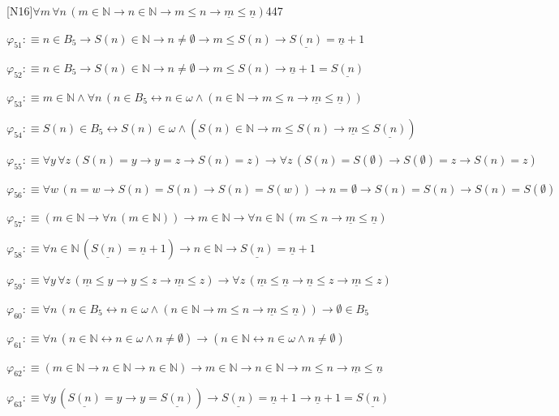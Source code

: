\begin{fullproof}{[N16]}{$\forall m\,\forall n\,(m \in \mathbb{N} \to n \in \mathbb{N} \to m \leq n \to \underline{m} \leq \underline{n})$}{447}
\begin{abbrevlist}
\item $\varphi_{51} :\equiv n \in B_{5} \to S(n) \in \mathbb{N} \to n \neq \emptyset \to m \leq S(n) \to \underline{S(n)} = \underline{n} + 1$
\item $\varphi_{52} :\equiv n \in B_{5} \to S(n) \in \mathbb{N} \to n \neq \emptyset \to m \leq S(n) \to \underline{n} + 1 = \underline{S(n)}$
\item $\varphi_{53} :\equiv m \in \mathbb{N} \land \forall n\,(n \in B_{5} \leftrightarrow n \in \omega \land (n \in \mathbb{N} \to m \leq n \to \underline{m} \leq \underline{n}))$
\item $\varphi_{54} :\equiv S(n) \in B_{5} \leftrightarrow S(n) \in \omega \land (S(n) \in \mathbb{N} \to m \leq S(n) \to \underline{m} \leq \underline{S(n)})$
\item $\varphi_{55} :\equiv \forall y\,\forall z\,(S(n) = y \to y = z \to S(n) = z) \to \forall z\,(S(n) = S(\emptyset) \to S(\emptyset) = z \to S(n) = z)$
\item $\varphi_{56} :\equiv \forall w\,(n = w \to S(n) = S(n) \to S(n) = S(w)) \to n = \emptyset \to S(n) = S(n) \to S(n) = S(\emptyset)$
\item $\varphi_{57} :\equiv (m \in \mathbb{N} \to \forall n\,(m \in \mathbb{N})) \to m \in \mathbb{N} \to \forall n \in \mathbb{N}\,(m \leq n \to \underline{m} \leq \underline{n})$
\item $\varphi_{58} :\equiv \forall n \in \mathbb{N}\,(\underline{S(n)} = \underline{n} + 1) \to n \in \mathbb{N} \to \underline{S(n)} = \underline{n} + 1$
\item $\varphi_{59} :\equiv \forall y\,\forall z\,(\underline{m} \leq y \to y \leq z \to \underline{m} \leq z) \to \forall z\,(\underline{m} \leq \underline{n} \to \underline{n} \leq z \to \underline{m} \leq z)$
\item $\varphi_{60} :\equiv \forall n\,(n \in B_{5} \leftrightarrow n \in \omega \land (n \in \mathbb{N} \to m \leq n \to \underline{m} \leq \underline{n})) \to \emptyset \in B_{5}$
\item $\varphi_{61} :\equiv \forall n\,(n \in \mathbb{N} \leftrightarrow n \in \omega \land n \neq \emptyset) \to (n \in \mathbb{N} \leftrightarrow n \in \omega \land n \neq \emptyset)$
\item $\varphi_{62} :\equiv (m \in \mathbb{N} \to n \in \mathbb{N} \to n \in \mathbb{N}) \to m \in \mathbb{N} \to n \in \mathbb{N} \to m \leq n \to \underline{m} \leq \underline{n}$
\item $\varphi_{63} :\equiv \forall y\,(\underline{S(n)} = y \to y = \underline{S(n)}) \to \underline{S(n)} = \underline{n} + 1 \to \underline{n} + 1 = \underline{S(n)}$

\end{abbrevlist}
\end{fullproof}
